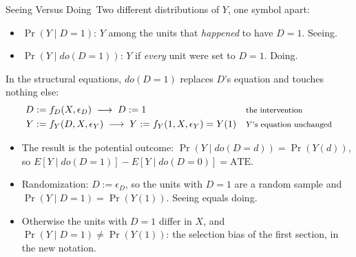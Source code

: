 \documentclass[aspectratio=169,11pt,xcolor=dvipsnames]{beamer}
\newcommand{\E}{E}
\newcommand{\adv}{\,\raisebox{0.6pt}{\textcolor{accent}{$\bigstar$}}}
\begin{document}
\begin{frame}{Seeing Versus Doing\adv}
Two different distributions of $Y$, one symbol apart:
\begin{itemize}\itemsep2pt
  \item $\Pr(Y \mid D = 1)$: $Y$ among the units that \emph{happened} to
        have $D = 1$. Seeing.
  \item $\Pr(Y \mid do(D = 1))$: $Y$ if \emph{every} unit were set to
        $D = 1$. Doing.
\end{itemize}
In the structural equations, $do(D = 1)$ replaces $D$'s equation and touches
nothing else:
\begin{align*}
  D &:= f_D(X, \epsilon_D) \;\longrightarrow\; D := 1
      && \text{\footnotesize the intervention} \\
  Y &:= f_Y(D, X, \epsilon_Y) \;\longrightarrow\; Y := f_Y(1, X, \epsilon_Y) = Y(1)
      && \text{\footnotesize $Y$'s equation unchanged}
\end{align*}
\begin{itemize}\itemsep2pt
  \item The result is the potential outcome: $\Pr(Y \mid do(D = d)) = \Pr(Y(d))$,
        so $\E[Y \mid do(D = 1)] - \E[Y \mid do(D = 0)] = \text{ATE}$.
  \item Randomization: $D := \epsilon_D$, so the units with $D = 1$ are a
        random sample and $\Pr(Y \mid D = 1) = \Pr(Y(1))$. Seeing equals
        doing.
  \item Otherwise the units with $D = 1$ differ in $X$, and
        $\Pr(Y \mid D = 1) \ne \Pr(Y(1))$: the selection bias of the first
        section, in the new notation.
\end{itemize}
\end{frame}
\end{document}
